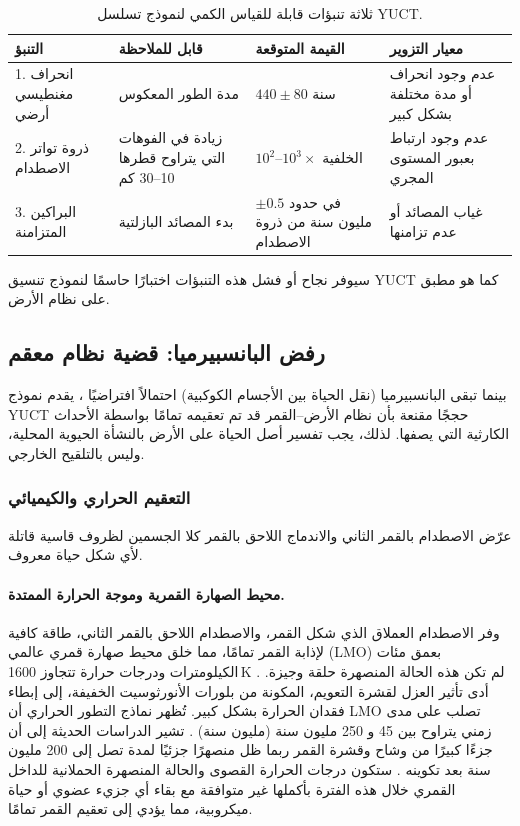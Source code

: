 \documentclass[11pt,a4paper]{article}
\begin{document}
	\begin{table}[H]
		\centering
		\small
		\caption{ثلاثة تنبؤات قابلة للقياس الكمي لنموذج تسلسل YUCT.}
		\label{tab:new_predictions}
		\begin{tabular}{p{3.9cm} p{4.4cm} p{4.7cm} p{4.0cm}}
			\toprule
			\textbf{التنبؤ} & \textbf{قابل للملاحظة} & \textbf{القيمة المتوقعة} & \textbf{معيار التزوير} \\
			\midrule
			1. انحراف مغنطيسي أرضي & مدة الطور المعكوس & \(440 \pm 80\) سنة & عدم وجود انحراف أو مدة مختلفة بشكل كبير \\
			2. ذروة تواتر الاصطدام & زيادة في الفوهات التي يتراوح قطرها 10–30 كم & \(10^{2}\)–\(10^{3}\times\) الخلفية & عدم وجود ارتباط بعبور المستوى المجري \\
			3. البراكين المتزامنة & بدء المصائد البازلتية & في حدود \(\pm 0.5\) مليون سنة من ذروة الاصطدام & غياب المصائد أو عدم تزامنها \\
			\bottomrule
		\end{tabular}
	\end{table}
	
	سيوفر نجاح أو فشل هذه التنبؤات اختبارًا حاسمًا لنموذج تنسيق YUCT كما هو مطبق على نظام الأرض.
	
	\subsection{رفض البانسبيرميا: قضية نظام معقم}
	
	بينما تبقى البانسبيرميا (نقل الحياة بين الأجسام الكوكبية) احتمالاً افتراضيًا \cite{PanspermiaReview}، يقدم نموذج YUCT حججًا مقنعة بأن نظام الأرض–القمر قد تم تعقيمه تمامًا بواسطة الأحداث الكارثية التي يصفها. لذلك، يجب تفسير أصل الحياة على الأرض بالنشأة الحيوية المحلية، وليس بالتلقيح الخارجي.
	
	\subsubsection{التعقيم الحراري والكيميائي}
	
	عرّض الاصطدام بالقمر الثاني والاندماج اللاحق بالقمر كلا الجسمين لظروف قاسية قاتلة لأي شكل حياة معروف.
	
	\paragraph{محيط الصهارة القمرية وموجة الحرارة الممتدة.}
	وفر الاصطدام العملاق الذي شكل القمر، والاصطدام اللاحق بالقمر الثاني، طاقة كافية لإذابة القمر تمامًا، مما خلق محيط صهارة قمري عالمي (LMO) بعمق مئات الكيلومترات ودرجات حرارة تتجاوز 1600 K \cite{Sahijpal2020}. لم تكن هذه الحالة المنصهرة حلقة وجيزة. أدى تأثير العزل لقشرة التعويم، المكونة من بلورات الأنورثوسيت الخفيفة، إلى إبطاء فقدان الحرارة بشكل كبير. تُظهر نماذج التطور الحراري أن LMO تصلب على مدى زمني يتراوح بين 45 و 250 مليون سنة (مليون سنة) \cite{Colin2024, Maurice2018}. تشير الدراسات الحديثة إلى أن جزءًا كبيرًا من وشاح وقشرة القمر ربما ظل منصهرًا جزئيًا لمدة تصل إلى 200 مليون سنة بعد تكوينه \cite{Maurice2020}. ستكون درجات الحرارة القصوى والحالة المنصهرة الحملانية للداخل القمري خلال هذه الفترة بأكملها غير متوافقة مع بقاء أي جزيء عضوي أو حياة ميكروبية، مما يؤدي إلى تعقيم القمر تمامًا.
	
\end{document}
